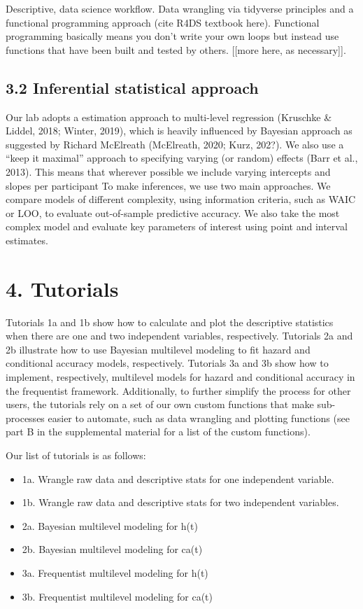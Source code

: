 \documentclass[
  man,floatsintext]{apa6}
\providecommand{\tightlist}{%
  \setlength{\itemsep}{0pt}\setlength{\parskip}{0pt}}
\begin{document}
Descriptive, data science workflow.
Data wrangling via tidyverse principles and a functional programming approach (cite R4DS textbook here).
Functional programming basically means you don't write your own loops but instead use functions that have been built and tested by others.
{[}{[}more here, as necessary{]}{]}.

\subsection{3.2 Inferential statistical approach}\label{inferential-statistical-approach}

Our lab adopts a estimation approach to multi-level regression (Kruschke \& Liddel, 2018; Winter, 2019), which is heavily influenced by Bayesian approach as suggested by Richard McElreath (McElreath, 2020; Kurz, 202?). We also use a ``keep it maximal'' approach to specifying varying (or random) effects (Barr et al., 2013). This means that wherever possible we include varying intercepts and slopes per participant
To make inferences, we use two main approaches. We compare models of different complexity, using information criteria, such as WAIC or LOO, to evaluate out-of-sample predictive accuracy. We also take the most complex model and evaluate key parameters of interest using point and interval estimates.

\section{4. Tutorials}\label{tutorials}

Tutorials 1a and 1b show how to calculate and plot the descriptive statistics when there are one and two independent variables, respectively. Tutorials 2a and 2b illustrate how to use Bayesian multilevel modeling to fit hazard and conditional accuracy models, respectively. Tutorials 3a and 3b show how to implement, respectively, multilevel models for hazard and conditional accuracy in the frequentist framework.
Additionally, to further simplify the process for other users, the tutorials rely on a set of our own custom functions that make sub-processes easier to automate, such as data wrangling and plotting functions (see part B in the supplemental material for a list of the custom functions).

Our list of tutorials is as follows:

\begin{itemize}
\tightlist
\item
  1a. Wrangle raw data and descriptive stats for one independent variable.
\item
  1b. Wrangle raw data and descriptive stats for two independent variables.
\item
  2a. Bayesian multilevel modeling for h(t)
\item
  2b. Bayesian multilevel modeling for ca(t)
\item
  3a. Frequentist multilevel modeling for h(t)
\item
  3b. Frequentist multilevel modeling for ca(t)
\end{itemize}
\end{document}
